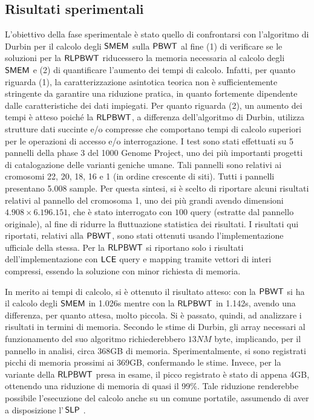 \documentclass[a4paper,11pt, oneside,italian]{article}
\def\SLP{\mbox{\rm {\sf SLP}}}
\def\LCE{\mbox{\rm {\sf LCE}}}
\def\PBWT{\mbox{\rm {\sf PBWT}}}
\def\RLPBWT{\mbox{\rm {\sf RLPBWT}}}
\def\SMEM{\mbox{\rm {\sf SMEM}}}
\def\LCE{\mbox{\rm {\sf LCE}}}
\begin{document}
\subsection*{Risultati sperimentali}
L'obiettivo della fase sperimentale è stato quello di confrontarsi con
l'algoritmo di Durbin per il calcolo degli $\SMEM$ sulla $\PBWT$ al fine 
(1) di verificare se le soluzioni per la $\RLPBWT$ riducessero la memoria
necessaria al calcolo degli 
$\SMEM$ e (2) di quantificare l'aumento dei tempi di calcolo.
Infatti, per quanto riguarda (1), la caratterizzazione asintotica teorica non è
sufficientemente stringente da garantire una riduzione pratica, in quanto
fortemente dipendente dalle caratteristiche dei dati impiegati.
Per quanto riguarda (2), un aumento dei tempi è atteso poiché la $\RLPBWT$,
a differenza dell'algoritmo di Durbin, utilizza strutture dati succinte e/o
compresse che comportano tempi di calcolo superiori per le operazioni di accesso
e/o interrogazione. 
I test sono stati effettuati su 5 pannelli della phase 3 del 1000 Genome
Project, uno dei più importanti progetti di catalogazione delle varianti
geniche 
umane. Tali pannelli sono relativi ai cromosomi 22, 20, 18, 16 e 1
(in ordine crescente di siti). Tutti i pannelli presentano 5.008 sample.
Per questa sintesi, si è scelto di riportare alcuni risultati relativi al
pannello del cromosoma 1, uno dei più grandi avendo dimensioni $4.908 \times
6.196.151$, che è stato 
interrogato con $100$ query (estratte dal pannello originale), al 
fine di ridurre la fluttuazione statistica dei risultati.
I risultati qui riportati, relativi alla $\PBWT$, sono stati ottenuti usando
l'implementazione ufficiale della stessa. Per la $\RLPBWT$ si riportano solo i
risultati dell'implementazione con $\LCE$ query e mapping tramite vettori di
interi compressi, essendo la soluzione con minor richiesta di memoria. 

In merito ai tempi di calcolo, si è ottenuto il risultato atteso: con
la $\PBWT$ si ha il calcolo degli $\SMEM$ in 1.026s
mentre con la $\RLPBWT$ in 1.142s, avendo una differenza, per quanto attesa,
molto piccola.
Si è passato, quindi, ad analizzare i risultati in termini di memoria. Secondo
le stime di Durbin, gli array necessari al funzionamento del suo algoritmo
richiederebbero $13NM$ byte, implicando, per il pannello in analisi, circa
368GB di memoria. 
Sperimentalmente, si sono registrati
picchi di memoria prossimi ai 369GB, confermando le stime. Invece,
per la variante della $\RLPBWT$ presa in esame, il picco
registrato è stato di appena 4GB, 
ottenendo una riduzione di memoria di quasi il 99\%. Tale riduzione renderebbe
possibile l'esecuzione del calcolo anche su un comune portatile, assumendo di
aver a disposizione l'$\,\SLP$ . 
\end{document}
